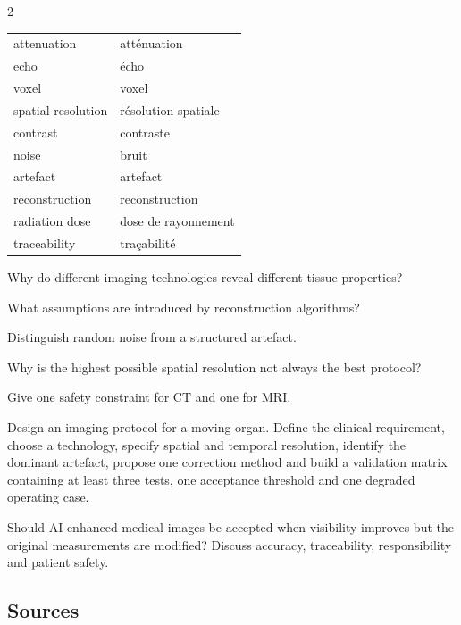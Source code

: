 \begin{multicols}{2}
\begin{vocabulary}
\begin{tabularx}{\linewidth}{@{}lX@{}}
attenuation & atténuation\\
echo & écho\\
voxel & voxel\\
spatial resolution & résolution spatiale\\
contrast & contraste\\
noise & bruit\\
artefact & artefact\\
reconstruction & reconstruction\\
radiation dose & dose de rayonnement\\
traceability & traçabilité
\end{tabularx}
\end{vocabulary}

\begin{questions}
\item Why do different imaging technologies reveal different tissue properties?
\item What assumptions are introduced by reconstruction algorithms?
\item Distinguish random noise from a structured artefact.
\item Why is the highest possible spatial resolution not always the best protocol?
\item Give one safety constraint for CT and one for MRI.
\end{questions}

\begin{engineeringchallenge}
Design an imaging protocol for a moving organ. Define the clinical requirement, choose a technology, specify
spatial and temporal resolution, identify the dominant artefact, propose one correction method and build a
validation matrix containing at least three tests, one acceptance threshold and one degraded operating case.
\end{engineeringchallenge}

\begin{speaking}
Should AI-enhanced medical images be accepted when visibility improves but the original measurements are
modified? Discuss accuracy, traceability, responsibility and patient safety.
\end{speaking}
\end{multicols}

\subsection*{Sources}
